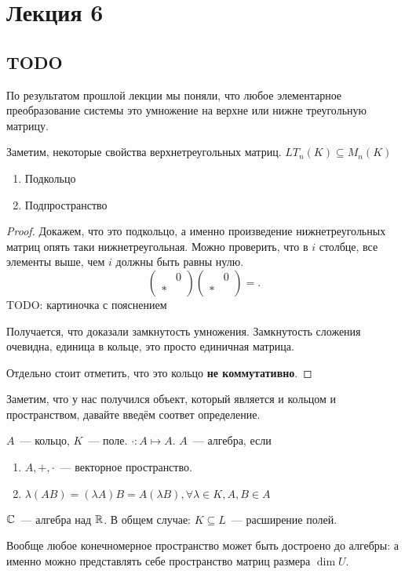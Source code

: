 \section{Лекция 6}
\subsection{TODO}
\begin{remark}
    По результатом прошлой лекции мы поняли,
    что любое элементарное преобразование системы
    это умножение на верхне или нижне треугольную матрицу.
\end{remark}
\begin{remark}
    Заметим, некоторые свойства верхнетреугольных матриц. $LT_n(K)\subseteq M_n(K)$ 
    \begin{enumerate}
        \item Подкольцо
        \item Подпространство
    \end{enumerate}
\end{remark}
\begin{proof}
    Докажем, что это подкольцо, а именно произведение нижнетреугольных матриц опять таки
    нижнетреугольная. Можно проверить, что в $i$ столбце, все элементы выше, чем $i$ 
    должны быть равны нулю.
    \[
    \begin{pmatrix}
        & 0\\
        *&
    \end{pmatrix}
    \begin{pmatrix}
        & 0\\
        *&
    \end{pmatrix}=
    .\] 
     TODO: картиночка с пояснением

     Получается, что доказали замкнутость умножения. Замкнутость сложения очевидна,
     единица в кольце, это просто единичная матрица. 
     
     Отдельно стоит отметить, что это кольцо \textbf{не коммутативно}.
\end{proof} 
\begin{motivation}
    Заметим, что у нас получился объект, который является и кольцом и пространством, давайте
    введём соответ определение.
\end{motivation}
\begin{definition}
    $A$~--- кольцо, $K$~--- поле.
    $\cdot: A\mapsto A$. $A$~--- алгебра, если 
     \begin{enumerate}
         \item $A,+,\cdot$~--- векторное пространство.
         \item $\lambda(AB) = (\lambda A)B = A(\lambda B), \forall \lambda\in K, A,B\in A$
    \end{enumerate}
\end{definition}
\begin{example}
    $\mathbb{C}$~--- алгебра над $\mathbb{R}$. В общем случае: $K\subseteq L$~--- расширение полей.
\end{example}
\begin{statement}
     Вообще любое конечномерное пространство может быть достроено до алгебры:
     а именно можно представлять себе пространство матриц размера $\dim U$.
\end{statement}
